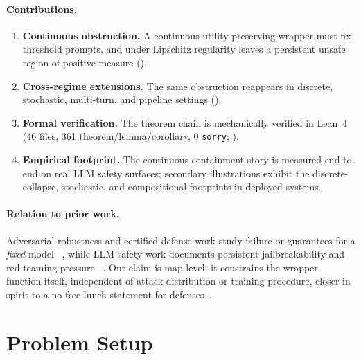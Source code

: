 \documentclass[11pt]{article}
\begin{document}
\paragraph{Contributions.}
\begin{enumerate}[nosep]
  \item \textbf{Continuous obstruction.} A continuous utility-preserving
    wrapper must fix threshold prompts, and under Lipschitz regularity
    leaves a persistent unsafe region of positive measure
    ().
  \item \textbf{Cross-regime extensions.} The same obstruction
    reappears in discrete, stochastic, multi-turn, and pipeline
    settings ().
  \item \textbf{Formal verification.} The theorem chain is mechanically
    verified in Lean~4 (46 files, 361 theorem/lemma/corollary,
    0 \texttt{sorry}; ).
  \item \textbf{Empirical footprint.} The continuous containment story
    is measured end-to-end on real LLM safety surfaces; secondary
    illustrations exhibit the discrete-collapse, stochastic, and
    compositional footprints in deployed systems.
\end{enumerate}

\paragraph{Relation to prior work.}
Adversarial-robustness and certified-defense work study failure or
guarantees for a \emph{fixed} model
~\cite{szegedy2013intriguing,goodfellow2014explaining,carlini2017evaluating,madry2018towards,cohen2019certified,katz2017reluplex,singh2019abstract,huang2017safety,bagnall2019certifying},
while LLM safety work documents persistent jailbreakability and
red-teaming pressure
~\cite{zou2023universal,chao2024jailbreaking,mehrotra2024tree,greshake2023indirect,mouret2015illuminating,samvelyan2024rainbow}.
Our claim is map-level: it constrains the wrapper function itself,
independent of attack distribution or training procedure, closer in
spirit to a no-free-lunch statement for defenses~\cite{wolpert1997no}.


\section{Problem Setup}
\label{sec:setup}
\end{document}
